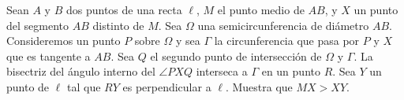 Sean $A$ y $B$ dos puntos de una recta $\ell$, $M$ el punto medio de $AB$, y $X$ un punto del segmento $AB$ distinto de $M$. Sea $\Omega$ una semicircunferencia de diámetro $AB$. Consideremos un punto $P$ sobre $\Omega$ y sea $\Gamma$ la circunferencia que pasa por $P$ y $X$ que es tangente a $AB$. Sea $Q$ el segundo punto de intersección de $\Omega$ y $\Gamma$. La bisectriz del ángulo interno del $\angle PXQ$ interseca a $\Gamma$ en un punto $R$. Sea $Y$ un punto de $\ell$ tal que $RY$ es perpendicular a $\ell$. Muestra que $MX \gt XY$.